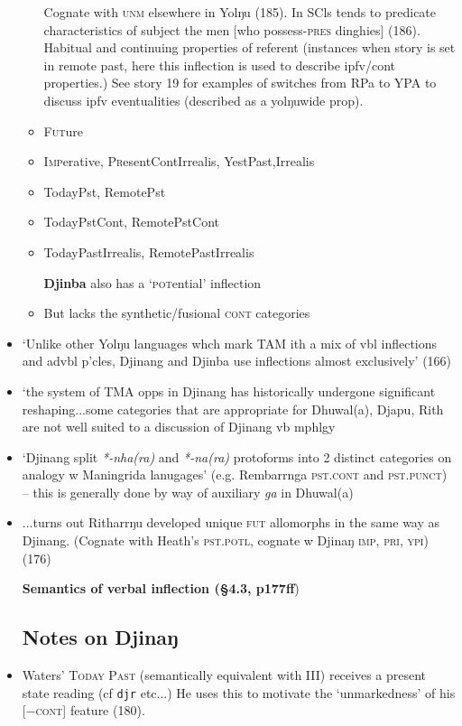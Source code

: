 \documentclass[10pt]{article}
\begin{document}
\begin{itemize}
\begin{itemize}
			Cognate with \textsc{unm} elsewhere in Yolŋu (185). In SCls tends to predicate characteristics of subject the men [who possess-\textsc{pres} dinghies] (186). Habitual and continuing properties of referent (instances when story is set in remote past, here this inflection is used to describe ipfv/cont properties.) See story 19 for examples of switches from RPa to YPA to discuss ipfv eventualities (described as a yolŋuwide prop).
			\item \textsc{Fut}ure
			\item \textsc{Imp}erative, \textsc{Pr}esentContIrrealis, YestPast,Irrealis
			\item TodayPst, RemotePst
			\item TodayPstCont, RemotePstCont
			\item TodayPastIrrealis, RemotePastIrrealis
			\item[\textbf{Djinba}] also has a `\textsc{pot}ential' inflection
			\item But lacks the synthetic/fusional \textsc{cont} categories
		\end{itemize}
	\item `Unlike other Yolŋu languages whch mark TAM ith a mix of vbl inflections and advbl p'cles, Djinang and Djinba use inflections almost exclusively' (166)
	\item `the system of TMA opps in Djinang has historically undergone significant reshaping...some categories that are appropriate for Dhuwal(a), Djapu, Rith are not well suited to a discussion of Djinang vb mphlgy
	\item `Djinang split \textit{*-nha(ra)} and \textit{*-na(ra)} protoforms into 2 distinct categories on analogy w Maningrida lanugages' (e.g. Rembarrnga \textsc{pst.cont} and \textsc{pst.punct}) -- this is generally done by way of auxiliary \textit{ga} in Dhuwal(a)
	\item ...turns out Ritharrŋu developed unique \textsc{fut} allomorphs in the same way as Djinang. (Cognate with Heath's \textsc{pst.potl}, cognate w Djinaŋ \textsc{imp, pri, ypi}) (176)
	\item[\textbf{Semantics of verbal inflection (§4.3, p177ff})] 
	
	
		\subsection{Notes on Djinaŋ}

		
			\item Waters' \textsc{Today Past} (semantically equivalent with III) receives a present state reading (cf \texttt{djr} etc...) He uses this to motivate the `unmarkedness' of his [$-$\textsc{cont}] feature (180).
			

\end{itemize}
\end{document}
